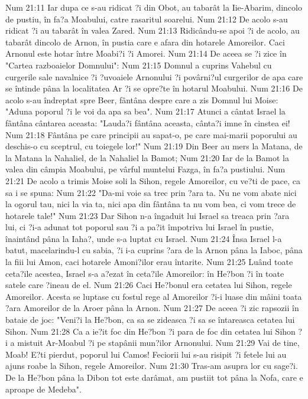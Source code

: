 Num 21:11  Iar dupa ce s-au ridicat ?i din Obot, au tabarât la Iie-Abarim, dincolo de pustiu, în fa?a Moabului, catre rasaritul soarelui.
Num 21:12  De acolo s-au ridicat ?i au tabarât în valea Zared.
Num 21:13  Ridicându-se apoi ?i de acolo, au tabarât dincolo de Arnon, în pustia care e afara din hotarele Amoreilor. Caci Arnonul este hotar între Moabi?i ?i Amorei.
Num 21:14  De aceea se ?i zice în "Cartea razboaielor Domnului":
Num 21:15  Domnul a cuprins Vahebul cu curgerile sale navalnice ?i ?uvoaiele Arnonului ?i povârni?ul curgerilor de apa care se întinde pâna la localitatea Ar ?i se opre?te în hotarul Moabului.
Num 21:16  De acolo s-au îndreptat spre Beer, fântâna despre care a zis Domnul lui Moise: "Aduna poporul ?i le voi da apa sa bea".
Num 21:17  Atunci a cântat Israel la fântâna cântarea aceasta: "Lauda?i fântâna aceasta, cânta?i imne în cinstea ei!
Num 21:18  Fântâna pe care principii au sapat-o, pe care mai-marii poporului au deschis-o cu sceptrul, cu toiegele lor!"
Num 21:19  Din Beer au mers la Matana, de la Matana la Nahaliel, de la Nahaliel la Bamot;
Num 21:20  Iar de la Bamot la valea din câmpia Moabului, pe vârful muntelui Fazga, în fa?a pustiului.
Num 21:21  De acolo a trimis Moise soli la Sihon, regele Amoreilor, cu ve?ti de pace, ca sa i se spuna:
Num 21:22  "Da-mi voie sa trec prin ?ara ta. Nu ne vom abate nici la ogorul tau, nici la via ta, nici apa din fântâna ta nu vom bea, ci vom trece de hotarele tale!"
Num 21:23  Dar Sihon n-a îngaduit lui Israel sa treaca prin ?ara lui, ci ?i-a adunat tot poporul sau ?i a pa?it împotriva lui Israel în pustie, înaintând pâna la Iaha?, unde s-a luptat cu Israel.
Num 21:24  Însa Israel l-a batut, macelarindu-l cu sabia, ?i i-a cuprins ?ara de la Arnon pâna la Iaboc, pâna la fiii lui Amon, caci hotarele Amoni?ilor erau întarite.
Num 21:25  Luând toate ceta?ile acestea, Israel s-a a?ezat în ceta?ile Amoreilor: în He?bon ?i în toate satele care ?ineau de el.
Num 21:26  Caci He?bonul era cetatea lui Sihon, regele Amoreilor. Acesta se luptase cu fostul rege al Amoreilor ?i-i luase din mâini toata ?ara Amoreilor de la Aroer pâna la Arnon.
Num 21:27  De aceea ?i zic rapsozii în bataie de joc: "Veni?i la He?bon, ca sa se zideasca ?i sa se întareasca cetatea lui Sihon.
Num 21:28  Ca a ie?it foc din He?bon ?i para de foc din cetatea lui Sihon ?i a mistuit Ar-Moabul ?i pe stapânii mun?ilor Arnonului.
Num 21:29  Vai de tine, Moab! E?ti pierdut, poporul lui Camos! Feciorii lui s-au risipit ?i fetele lui au ajuns roabe la Sihon, regele Amoreilor.
Num 21:30  Tras-am asupra lor cu sage?i. De la He?bon pâna la Dibon tot este darâmat, am pustiit tot pâna la Nofa, care e aproape de Medeba".
